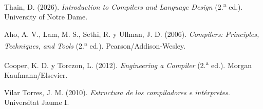 \documentclass[11pt,spanish]{article}
\begin{document}
\begin{enumerate}[label=\textbf{[\arabic*]}]
    \item Thain, D. (2026). \textit{Introduction to Compilers and Language Design} (2.\textsuperscript{a} ed.). University of Notre Dame.
    \item Aho, A. V., Lam, M. S., Sethi, R. y Ullman, J. D. (2006). \textit{Compilers: Principles, Techniques, and Tools} (2.\textsuperscript{a} ed.). Pearson/Addison-Wesley.
    \item Cooper, K. D. y Torczon, L. (2012). \textit{Engineering a Compiler} (2.\textsuperscript{a} ed.). Morgan Kaufmann/Elsevier.
    \item Vilar Torres, J. M. (2010). \textit{Estructura de los compiladores e intérpretes}. Universitat Jaume I.
\end{enumerate}
\end{document}
